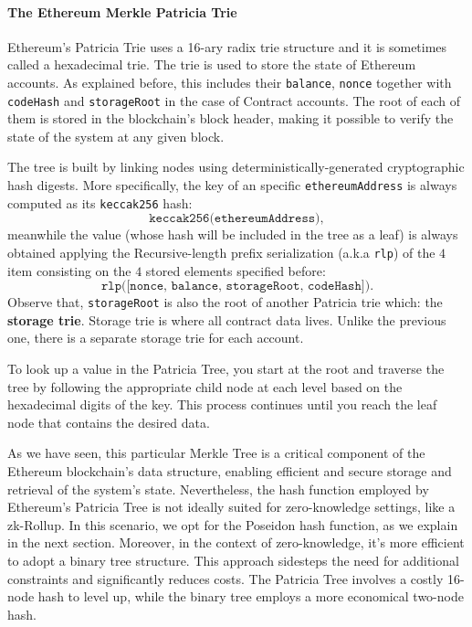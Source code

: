 \paragraph*{The Ethereum Merkle Patricia Trie}

Ethereum's Patricia Trie uses a 16-ary radix trie structure and it is sometimes called a hexadecimal trie. The trie is used to store the state of Ethereum accounts. As explained before, this includes their \texttt{balance}, \texttt{nonce} together with \texttt{codeHash} and \texttt{storageRoot} in the case of Contract accounts. The root of each of them is stored in the blockchain's block header, making it possible to verify the state of the system at any given block.

The tree is built by linking nodes using deterministically-generated cryptographic hash digests. More specifically, the key of an specific \texttt{ethereumAddress} is always computed as its \texttt{keccak256} hash:
\[
\texttt{keccak256(ethereumAddress)},
\]
meanwhile the value (whose hash will be included in the tree as a leaf) is always obtained applying the Recursive-length prefix serialization (a.k.a \texttt{rlp}) of the $4$ item consisting on the $4$ stored elements specified before:
\[
\texttt{rlp([nonce, balance, storageRoot, codeHash])}.
\]
Observe that, \texttt{storageRoot} is also the root of another Patricia trie which: the \textbf{storage trie}.
 Storage trie is where all contract data lives. Unlike the previous one, there is a separate storage trie for each account.

To look up a value in the Patricia Tree, you start at the root and traverse the tree by following the appropriate child node at each level based on the hexadecimal digits of the key. This process continues until you reach the leaf node that contains the desired data.

As we have seen, this particular Merkle Tree is a critical component of the Ethereum blockchain's data structure, enabling efficient and secure storage and retrieval of the system's state. Nevertheless, the hash function employed by Ethereum's Patricia Tree is not ideally suited for zero-knowledge settings, like a zk-Rollup. In this scenario, we opt for the Poseidon hash function, as we explain in the next section. Moreover, in the context of zero-knowledge, it's more efficient to adopt a binary tree structure. This approach sidesteps the need for additional constraints and significantly reduces costs. The Patricia Tree involves a costly 16-node hash to level up, while the binary tree employs a more economical two-node hash.







